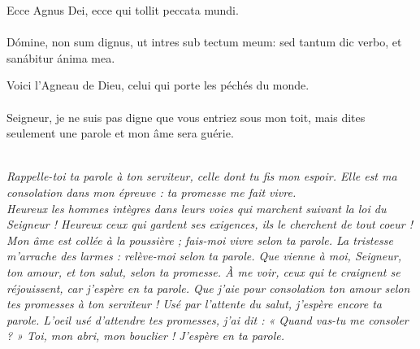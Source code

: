 \documentclass[twoside]{article}
\begin{document}
\begin{paracol}{2}
\switchcolumn*

\vv Ecce Agnus Dei, ecce qui tollit peccata mundi.\\
\\
\rr Dómine, non sum dignus, ut intres sub tectum meum: sed tantum dic verbo, et sanábitur ánima mea.

\switchcolumn

\vv Voici l'Agneau de Dieu, celui qui porte les péchés du monde.\\
~\\
\rr Seigneur, je ne suis pas digne que vous entriez sous mon toit, mais dites seulement une parole et mon âme sera guérie.
\end{paracol}


\\
\emph{\rr Rappelle-toi ta parole à ton serviteur, celle dont tu fis mon espoir. Elle est ma consolation dans mon épreuve : ta promesse me fait vivre.\\
\vv {} Heureux les hommes intègres dans leurs voies qui marchent suivant la loi du Seigneur !\capsaut
\vv {} Heureux ceux qui gardent ses exigences, ils le cherchent de tout coeur !\capsaut
\vv {} Mon âme est collée à la poussière ; fais-moi vivre selon ta parole.\capsaut
\vv {} La tristesse m'arrache des larmes : relève-moi selon ta parole.\capsaut
\vv {} Que vienne à moi, Seigneur, ton amour, et ton salut, selon ta promesse.\capsaut
\vv {} À me voir, ceux qui te craignent se réjouissent, car j'espère en ta parole.\capsaut
\vv {} Que j'aie pour consolation ton amour selon tes promesses à ton serviteur !\capsaut
\vv {} Usé par l'attente du salut, j'espère encore ta parole.\capsaut
\vv {} L'oeil usé d'attendre tes promesses, j'ai dit : « Quand vas-tu me consoler ? »\capsaut
\vv {} Toi, mon abri, mon bouclier ! J'espère en ta parole.
}
\newpage
\end{document}
